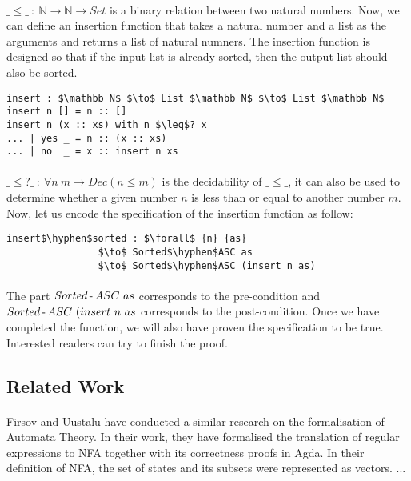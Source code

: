 \paragraph{} \(\_\leq\_\ :\ \mathbb N \to \mathbb N \to Set\) is a binary relation between two natural
numbers. Now, we can define an insertion function that takes a
natural number and a list as the arguments and returns a list of
natural numners. The insertion function is designed so that if the
input list is already sorted, then the output list should also be sorted. 

\begin{lstlisting}[mathescape=true,xleftmargin=.25\textwidth]
insert : $\mathbb N$ $\to$ List $\mathbb N$ $\to$ List $\mathbb N$
insert n [] = n :: []
insert n (x :: xs) with n $\leq$? x
... | yes _ = n :: (x :: xs)
... | no  _ = x :: insert n xs
\end{lstlisting}

\paragraph{} \(\_\leq ?\_\ :\ \forall n\ m \to Dec (n \leq m)\) is the
decidability of \(\_\leq\_\), it can also be used to determine whether
a given number \(n\) is less than or equal to another number
\(m\). Now, let us encode the specification of the insertion function
as follow: 
\begin{lstlisting}[mathescape=true,xleftmargin=.25\textwidth]
insert$\hyphen$sorted : $\forall$ {n} {as} 
                $\to$ Sorted$\hyphen$ASC as 
                $\to$ Sorted$\hyphen$ASC (insert n as)
\end{lstlisting}

\paragraph{} The part \(Sorted\operatorname{-} ASC\ as\) corresponds to the pre-condition and
\(Sorted\operatorname{-} ASC\ (insert\ n\ as\) corresponds to the
post-condition. Once we have completed the
function, we will also have proven the specification to be
true. Interested readers can try to finish the proof. 


\subsection{Related Work}
\paragraph{} Firsov and Uustalu \cite{firsov2013} have conducted a
similar research on the formalisation of Automata Theory. In their
work, they have formalised the translation of regular expressions to NFA together with
its correctness proofs in Agda. In their definition
of NFA, the set of states and its subsets were represented as
vectors. ... 